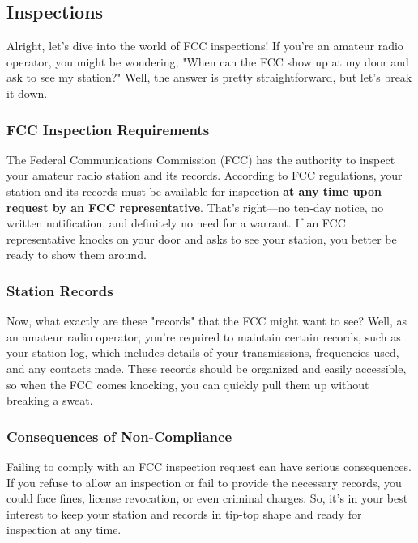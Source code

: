 \subsection{Inspections}
\label{subsec:inspections}

Alright, let's dive into the world of FCC inspections! If you're an amateur radio operator, you might be wondering, "When can the FCC show up at my door and ask to see my station?" Well, the answer is pretty straightforward, but let's break it down.

\subsubsection*{FCC Inspection Requirements}
The Federal Communications Commission (FCC) has the authority to inspect your amateur radio station and its records. According to FCC regulations, your station and its records must be available for inspection \textbf{at any time upon request by an FCC representative}. That's right—no ten-day notice, no written notification, and definitely no need for a warrant. If an FCC representative knocks on your door and asks to see your station, you better be ready to show them around.

\subsubsection*{Station Records}
Now, what exactly are these "records" that the FCC might want to see? Well, as an amateur radio operator, you're required to maintain certain records, such as your station log, which includes details of your transmissions, frequencies used, and any contacts made. These records should be organized and easily accessible, so when the FCC comes knocking, you can quickly pull them up without breaking a sweat.

\subsubsection*{Consequences of Non-Compliance}
Failing to comply with an FCC inspection request can have serious consequences. If you refuse to allow an inspection or fail to provide the necessary records, you could face fines, license revocation, or even criminal charges. So, it's in your best interest to keep your station and records in tip-top shape and ready for inspection at any time.


